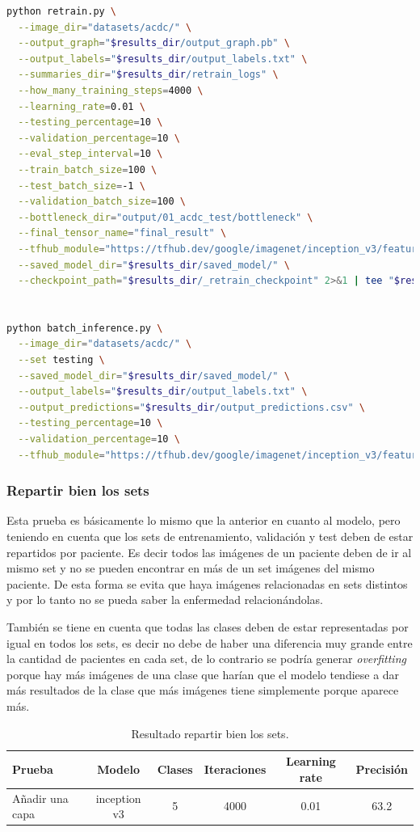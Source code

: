 \documentclass[12pt,a4paper]{article}
\begin{document}
\begin{lstlisting}[language=Bash]
python retrain.py \
  --image_dir="datasets/acdc/" \
  --output_graph="$results_dir/output_graph.pb" \
  --output_labels="$results_dir/output_labels.txt" \
  --summaries_dir="$results_dir/retrain_logs" \
  --how_many_training_steps=4000 \
  --learning_rate=0.01 \
  --testing_percentage=10 \
  --validation_percentage=10 \
  --eval_step_interval=10 \
  --train_batch_size=100 \
  --test_batch_size=-1 \
  --validation_batch_size=100 \
  --bottleneck_dir="output/01_acdc_test/bottleneck" \
  --final_tensor_name="final_result" \
  --tfhub_module="https://tfhub.dev/google/imagenet/inception_v3/feature_vector/3" \
  --saved_model_dir="$results_dir/saved_model/" \
  --checkpoint_path="$results_dir/_retrain_checkpoint" 2>&1 | tee "$results_dir/output_retrain"


python batch_inference.py \
  --image_dir="datasets/acdc/" \
  --set testing \
  --saved_model_dir="$results_dir/saved_model/" \
  --output_labels="$results_dir/output_labels.txt" \
  --output_predictions="$results_dir/output_predictions.csv" \
  --testing_percentage=10 \
  --validation_percentage=10 \
  --tfhub_module="https://tfhub.dev/google/imagenet/inception_v3/feature_vector/3" 2>&1 | tee "$results_dir/output_inference"
\end{lstlisting}

\subsubsection{Repartir bien los sets}
Esta prueba es básicamente lo mismo que la anterior en cuanto al modelo, pero teniendo en cuenta que los sets de entrenamiento, validación y test deben de estar repartidos por paciente. Es decir todos las imágenes de un paciente deben de ir al mismo set y no se pueden encontrar en más de un set imágenes del mismo paciente. De esta forma se evita que haya imágenes relacionadas en sets distintos y por lo tanto no se pueda saber la enfermedad relacionándolas.
\bigskip

También se tiene en cuenta que todas las clases deben de estar representadas por igual en todos los sets, es decir no debe de haber una diferencia muy grande entre la cantidad de pacientes en cada set, de lo contrario se podría generar \textit{overfitting} porque hay más imágenes de una clase que harían que el modelo tendiese a dar más resultados de la clase que más imágenes tiene simplemente porque aparece más.

\begin{table}[H]
\centering
\begin{tabular}{|l|c|c|c|c|c|}
\hline
\textbf{Prueba} & \textbf{Modelo} & \textbf{Clases} & \textbf{Iteraciones} & \textbf{Learning rate} & \textbf{Precisión} \\ \hline
Añadir una capa & inception v3    & 5               & 4000                 & 0.01                   & 63.2               \\ \hline
\end{tabular}
\caption{Resultado repartir bien los sets.}
\end{table}
\end{document}
